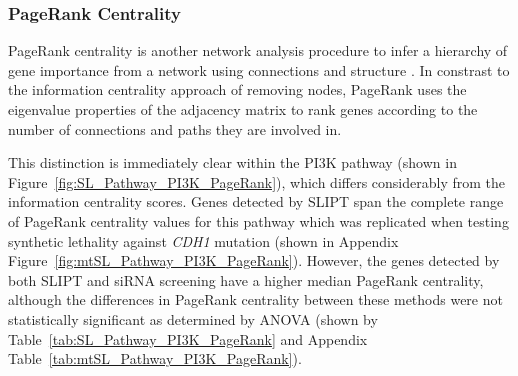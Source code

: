 \begin{table*}[!htb]
\caption{\gls{ANOVA} for Synthetic Lethality and Information Centrality}
\label{tab:SL_Pathway_PI3K_InfoCent}
\noindent{}
\end{table*} \filbreak

\FloatBarrier

\subsubsection{PageRank Centrality}  \label{chapt4:Network_PageRank}

\FloatBarrier

PageRank centrality is another network analysis procedure to infer a hierarchy of gene importance from a network using connections and structure \citep{Brin1998}. In constrast to the information centrality approach of removing nodes, PageRank uses the eigenvalue properties of the adjacency matrix to rank genes according to the number of connections and paths they are involved in. 

This distinction is immediately clear within the PI3K pathway (shown in Figure~\ref{fig:SL_Pathway_PI3K_PageRank}), which differs considerably from the information centrality scores. Genes detected by \gls{SLIPT} span the complete range of PageRank centrality values for this pathway which was replicated when testing synthetic lethality against \textit{CDH1} mutation (shown in Appendix Figure~\ref{fig:mtSL_Pathway_PI3K_PageRank}).  However, the genes detected by both \gls{SLIPT} and \gls{siRNA} screening have a higher median PageRank centrality, although the differences in PageRank centrality between these methods were not statistically significant as determined by \gls{ANOVA} (shown by Table~\ref{tab:SL_Pathway_PI3K_PageRank} and Appendix Table~\ref{tab:mtSL_Pathway_PI3K_PageRank}).

